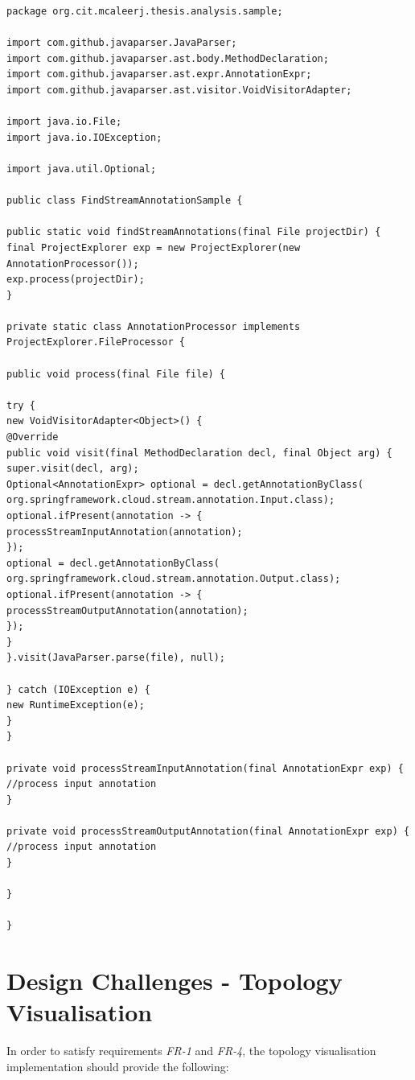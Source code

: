 \begin{lstlisting}[caption={Discovery of Spring Cloud message channels by static analysis}]
package org.cit.mcaleerj.thesis.analysis.sample;

import com.github.javaparser.JavaParser;
import com.github.javaparser.ast.body.MethodDeclaration;
import com.github.javaparser.ast.expr.AnnotationExpr;
import com.github.javaparser.ast.visitor.VoidVisitorAdapter;

import java.io.File;
import java.io.IOException;

import java.util.Optional;

public class FindStreamAnnotationSample {

public static void findStreamAnnotations(final File projectDir) {
final ProjectExplorer exp = new ProjectExplorer(new AnnotationProcessor());
exp.process(projectDir);
}

private static class AnnotationProcessor implements ProjectExplorer.FileProcessor {

public void process(final File file) {

try {
new VoidVisitorAdapter<Object>() {
@Override
public void visit(final MethodDeclaration decl, final Object arg) {
super.visit(decl, arg);
Optional<AnnotationExpr> optional = decl.getAnnotationByClass(
org.springframework.cloud.stream.annotation.Input.class);
optional.ifPresent(annotation -> {
processStreamInputAnnotation(annotation);
});
optional = decl.getAnnotationByClass(
org.springframework.cloud.stream.annotation.Output.class);
optional.ifPresent(annotation -> {
processStreamOutputAnnotation(annotation);
});
}
}.visit(JavaParser.parse(file), null);

} catch (IOException e) {
new RuntimeException(e);
}
}

private void processStreamInputAnnotation(final AnnotationExpr exp) {
//process input annotation
}

private void processStreamOutputAnnotation(final AnnotationExpr exp) {
//process input annotation
}

}

}

\end{lstlisting}

\section{Design Challenges - Topology Visualisation}\label{design_topology_visualisation}

In order to satisfy requirements \textit{FR-1} and \textit{FR-4}, the topology visualisation implementation should provide the following:

